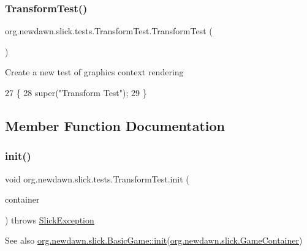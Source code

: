 \subsubsection{\texorpdfstring{Transform\+Test()}{TransformTest()}}
{\footnotesize\ttfamily org.\+newdawn.\+slick.\+tests.\+Transform\+Test.\+Transform\+Test (\begin{DoxyParamCaption}{ }\end{DoxyParamCaption})\hspace{0.3cm}{\ttfamily [inline]}}

Create a new test of graphics context rendering 
\begin{DoxyCode}
27                            \{
28         super(\textcolor{stringliteral}{"Transform Test"});
29     \}
\end{DoxyCode}


\subsection{Member Function Documentation}
\mbox{\label{classorg_1_1newdawn_1_1slick_1_1tests_1_1_transform_test_a02c6b90af96ba846d8b48b5f9d7783e8}} 
\subsubsection{\texorpdfstring{init()}{init()}}
{\footnotesize\ttfamily void org.\+newdawn.\+slick.\+tests.\+Transform\+Test.\+init (\begin{DoxyParamCaption}\item[{\mbox{\hyperlink{classorg_1_1newdawn_1_1slick_1_1_game_container}{Game\+Container}}}]{container }\end{DoxyParamCaption}) throws \mbox{\hyperlink{classorg_1_1newdawn_1_1slick_1_1_slick_exception}{Slick\+Exception}}\hspace{0.3cm}{\ttfamily [inline]}}

\begin{DoxySeeAlso}{See also}
\mbox{\hyperlink{classorg_1_1newdawn_1_1slick_1_1_basic_game_a8af0900217e4d389249f71367b22d114}{org.\+newdawn.\+slick.\+Basic\+Game\+::init}}(\mbox{\hyperlink{classorg_1_1newdawn_1_1slick_1_1_game_container}{org.\+newdawn.\+slick.\+Game\+Container}}) 
\end{DoxySeeAlso}


